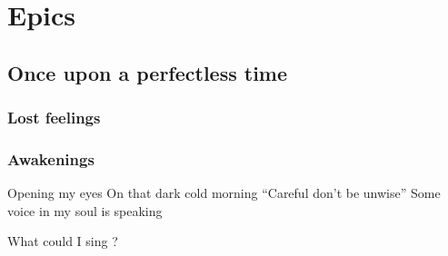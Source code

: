 \documentclass{article}
\newenvironment{album}[1]%
{%
  \section*{#1}
}%
{%
}
\newenvironment{song}[1]%
{%
  \subsection*{\textbf{#1}}
  \begin{multicols*}{2}
}%
{%
  \end{multicols*}
  \newpage
}
\newenvironment{partie}[1]%
{%
  \subsubsection{#1}
}%
{%
}
\newenvironment{couplet} %
{%
  \verbatim
}%
{% end code
  \endverbatim
}
\newenvironment{refrain} %
{%
  \verbatim
}%
{% end code
  \endverbatim
}
\begin{document}
\begin{album}{Epics}
\begin{song}{Once upon a perfectless time}
\begin{partie}{Lost feelings}
\end{partie}
\begin{partie}{Awakenings}
\begin{couplet}
Opening my eyes
On that dark cold morning
“Careful don’t be unwise”
Some voice in my soul is speaking
\end{couplet}
\begin{refrain}
What could I sing ?

\end{refrain}
\end{partie}
\end{song}
\end{album}
\end{document}
